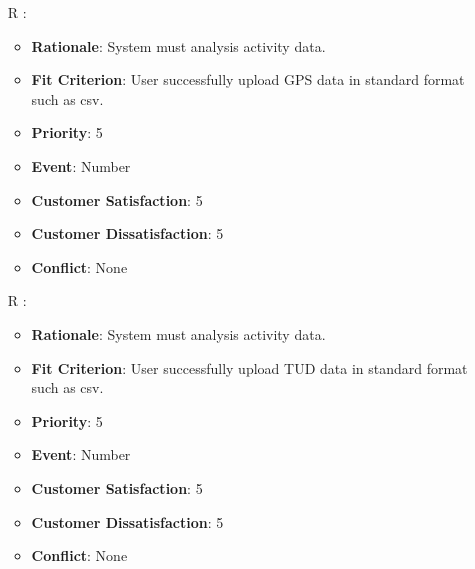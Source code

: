 \documentclass[12pt, titlepage]{article}
\newcounter{reqnum} %
\begin{document}
\noindent \begin{itemize}

\subsubsection{Functional Requirements}

\subsubsection{Data Requirements}

\item[R\refstepcounter{reqnum}\thereqnum
\label{R_Inputs_1}:] 
\begin{itemize}
    \item \textbf{Rationale}: System must analysis activity data.
    \item \textbf{Fit Criterion}: User successfully upload GPS data in standard format such as csv. 
    \item \textbf{Priority}: 5
    \item \textbf{Event}: Number%
    \item \textbf{Customer Satisfaction}: 5
    \item \textbf{Customer Dissatisfaction}: 5
    \item \textbf{Conflict}: None
\end{itemize}

\item[R\refstepcounter{reqnum}\thereqnum
\label{R_Inputs_1}:] 
\begin{itemize}
    \item \textbf{Rationale}: System must analysis activity data.
    \item \textbf{Fit Criterion}: User successfully upload TUD data in standard format such as csv. 
    \item \textbf{Priority}: 5
    \item \textbf{Event}: Number%
    \item \textbf{Customer Satisfaction}: 5
    \item \textbf{Customer Dissatisfaction}: 5
    \item \textbf{Conflict}: None
\end{itemize}


\end{itemize}
\end{document}

